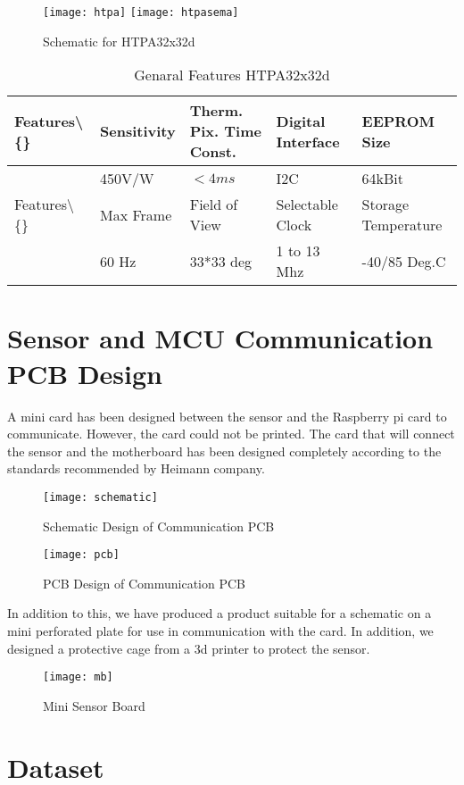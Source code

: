 \documentclass[thesis]{deutez}
\begin{document}
\begin{figure}[h!]
	\centering
	\texttt{[image: htpa]}
	\texttt{[image: htpasema]}
	\caption{Schematic for HTPA32x32d}
\end{figure}
\FloatBarrier
	\begin{flushleft}
\begin{table}[h!]

	\caption{Genaral Features HTPA32x32d}
	\begin{tabular}{|l|l|l|l|l|}
		\hline
		Features\textbackslash\{\}& Sensitivity & Therm. Pix. Time Const. & Digital Interface & EEPROM Size\\\hline
		& 450V/W&$<4ms $& I2C & 64kBit  \\\hline
		Features\textbackslash\{\}& Max Frame&Field of View & Selectable Clock & Storage Temperature \\\hline
		&60 Hz& 33*33 deg & 1 to 13 Mhz & -40/85 Deg.C \\\hline
	\end{tabular}
\end{table}
\end{flushleft}
\FloatBarrier
\section{Sensor and MCU Communication PCB Design}
A mini card has been designed between the sensor and the Raspberry pi card to communicate. However, the card could not be printed. The card that will connect the sensor and the motherboard has been designed completely according to the standards recommended by Heimann company.\\
\begin{figure}[h!]
	\centering
	\texttt{[image: schematic]}
	\caption{Schematic Design of Communication PCB}
	\texttt{[image: pcb]}
	\caption{PCB Design of Communication PCB}
\end{figure}
\FloatBarrier
In addition to this, we have produced a product suitable for a schematic on a mini perforated plate for use in communication with the card. In addition, we designed a protective cage from a 3d printer to protect the sensor.\\
\begin{figure}[h!]
	\centering
	\texttt{[image: mb]}
	\caption{Mini Sensor Board}
\end{figure}

\section{Dataset}
\end{document}
